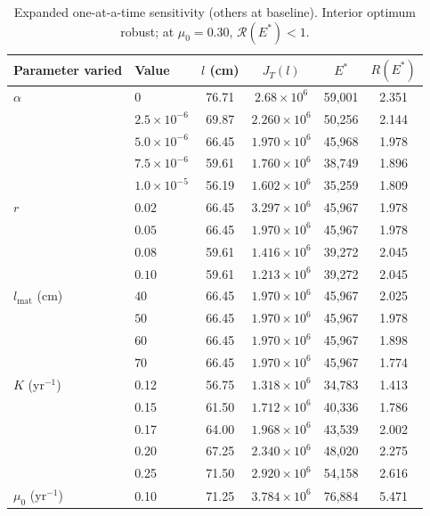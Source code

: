 \documentclass[pdflatex,sn-mathphys-num]{sn-jnl}
\newcommand{\R}{\mathcal{R}}
\theoremstyle{thmstyleone}
\theoremstyle{definition}
\theoremstyle{remark}
\begin{document}
\begin{table}[htbp]
\centering
\caption{Expanded one-at-a-time sensitivity (others at baseline).
Interior optimum robust; at $\mu_0=0.30$, $\R(E^*)<1$.}
\label{tab:sensitivity}
\begin{tabular}{llcccc}
\hline
Parameter varied & Value & \(l\) (cm) & \(J_T(l)\) & \(E^*\) & \(R(E^*)\)\\
\toprule
\(\alpha\) & \(0\) & 76.71 & \(2.68\times10^6\) & 59{,}001 & 2.351 \\
  & \(2.5\times10^{-6}\) & 69.87 & \(2.260\times10^6\) & 50{,}256 & 2.144 \\
  & \(5.0\times10^{-6}\) & 66.45 & \(1.970\times10^6\) & 45{,}968 & 1.978 \\
  & \(7.5\times10^{-6}\) & 59.61 & \(1.760\times10^6\) & 38{,}749 & 1.896 \\
 & \(1.0\times10^{-5}\) & 56.19 & \(1.602\times10^6\) & 35{,}259 & 1.809 \\
\midrule
\(r\) & \(0.02\) & 66.45 & \(3.297\times10^6\) & 45{,}967 & 1.978 \\
  & \(0.05\) & 66.45 & \(1.970\times10^6\) & 45{,}967 & 1.978 \\
  & \(0.08\) & 59.61 & \(1.416\times10^6\) & 39{,}272 & 2.045 \\
  & \(0.10\) & 59.61 & \(1.213\times10^6\) & 39{,}272 & 2.045 \\
\midrule
\(l_{\mathrm{mat}}\) (cm) & \(40\) & 66.45 & \(1.970\times10^6\) & 45{,}967 & 2.025 \\
                & \(50\) & 66.45 & \(1.970\times10^6\) & 45{,}967 & 1.978 \\
                & \(60\) & 66.45 & \(1.970\times10^6\) & 45{,}967 & 1.898 \\
                & \(70\) & 66.45 & \(1.970\times10^6\) & 45{,}967 & 1.774 \\
\midrule
$K$ (yr$^{-1}$) & 0.12 & 56.75 & $1.318\times10^6$ & 34{,}783 & 1.413\\
                & 0.15 & 61.50 & $1.712\times10^6$ & 40{,}336 & 1.786\\
                & 0.17 & 64.00 & $1.968\times10^6$ & 43{,}539 & 2.002\\
                & 0.20 & 67.25 & $2.340\times10^6$ & 48{,}020 & 2.275\\
                & 0.25 & 71.50 & $2.920\times10^6$ & 54{,}158 & 2.616\\
\midrule
$\mu_0$ (yr$^{-1}$) & 0.10 & 71.25 & $3.784\times10^6$ & 76{,}884 & 5.471\\

\end{tabular}
\end{table}
\end{document}
